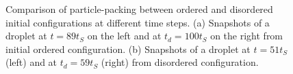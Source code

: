 \documentclass[aps,prl,superscriptaddress,twocolumn,showpacs,floatfix]{revtex4-1}
\begin{document}
\begin{figure}[tbph]
\centering
\vspace{.5in}
\vspace{.05in}
\caption{Comparison of particle-packing between ordered and disordered initial configurations at different time steps. (a) Snapshots of a droplet at $t=89 t_S$ on the left and at $t_{d}=100 t_S$ on the right from initial ordered configuration. (b) Snapshots of a droplet at $t=51 t_S$ (left) and at $t_{d}=59 t_S$ (right) from disordered configuration.}
\label{fig:order/random}
\end{figure}
\end{document}
